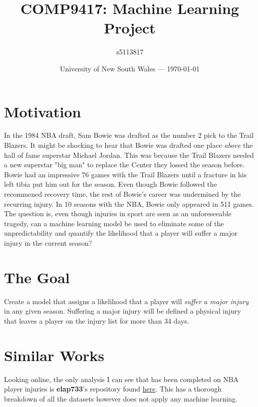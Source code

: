 \documentclass{article}
\title{COMP9417: Machine Learning Project} %
\author{z5113817} %
\date{University of New South Wales --- \today} %
\newcommand{\injurydef}{a physical injury that leaves a player on the injury list for more than 34 days}
\begin{document}
\maketitle %



\section*{Motivation}

In the 1984 NBA draft, Sam Bowie was drafted as the number 2 pick to the Trail Blazers.
It might be shocking to hear that Bowie was drafted one place \emph{above} the hall of fame superstar Michael Jordan.
This was because the Trail Blazers needed a new superstar "big man" to replace the Center they lossed the season before.
Bowie had an impressive 76 games with the Trail Blazers until a fracture in his left tibia put him out for the season.
Even though Bowie followed the recommened recovery time, the rest of Bowie's career was undermined by the recurring injury.
In 10 seasons with the NBA, Bowie only appeared in 511 games.\\

The question is, even though injuries in sport are seen as an unforeseeable tragedy, can a
machine learning model be used to eliminate some of the unpredictability and quantify
the likelihood that a player will suffer a major injury in the current season?

\section*{The Goal}

Create a model that assigns a likelihood that a player will \emph{suffer a major injury}
in any given season. Suffering a major injury will be defined \injurydef.

\section*{Similar Works}

Looking online, the only analysis I can see that has been completed on NBA  player injuries
is \textbf{elap733}'s repository found \href{https://github.com/elap733/NBA-Injuries-Analysis/tree/master}{here}. 
This has a thorough breakdown of all the datasets however does not apply any machine learning.
\end{document}
